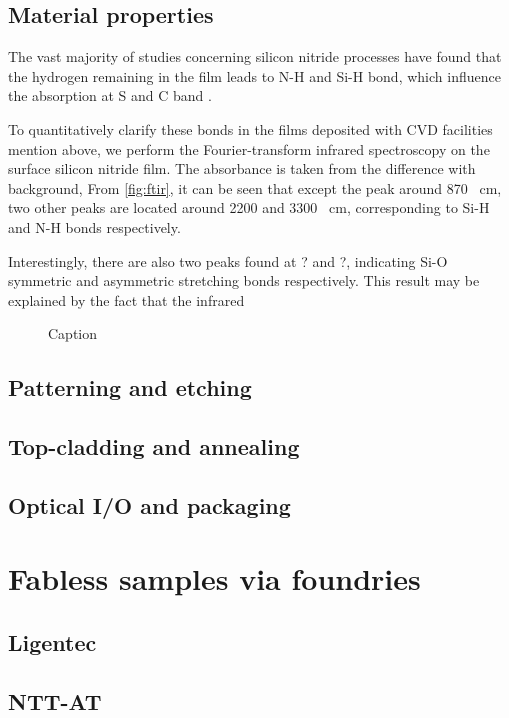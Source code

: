 \subsection{Material properties}
The vast majority of studies concerning silicon nitride processes have found that the hydrogen remaining in the film leads to N-H and Si-H bond, which influence the absorption at S and C band \cites{Ay2004, Agnihotri2000}. 

To quantitatively clarify these bonds in the films deposited with CVD facilities mention above, we perform the Fourier-transform infrared spectroscopy on the surface silicon nitride film. The absorbance is taken from the difference with background, From \autoref{fig:ftir}, it can be seen that except the peak around 870 \si{\per\cm}, two other peaks are located around 2200 and 3300 \si{\per\cm}, corresponding to Si-H and N-H bonds respectively.

Interestingly, there are also two peaks found at ? and ?, indicating Si-O symmetric and asymmetric stretching bonds respectively. This result may be explained by the fact that the infrared 



\cite{Shaw2005}

\begin{figure}
    \centering
    
    \caption{Caption}
    \label{fig:ftir}
\end{figure}

\subsection{Patterning and etching}

\subsection{Top-cladding and annealing}

\subsection{Optical I/O and packaging}

\section{Fabless samples via foundries}

\subsection{Ligentec}

\subsection{NTT-AT}

